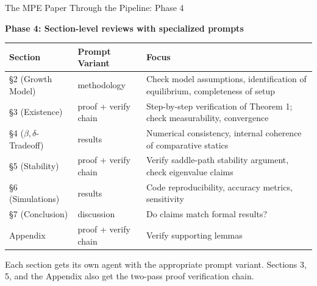 \documentclass[10pt,english,aspectratio=169]{beamer}
\begin{document}
\begin{frame}{The MPE Paper Through the Pipeline: Phase 4}

\textbf{Phase 4: Section-level reviews with specialized prompts}

\vspace{0.3cm}
\begin{small}
\begin{tabular}{lp{4cm}p{6cm}}
\toprule
\textbf{Section} & \textbf{Prompt Variant} & \textbf{Focus} \\
\midrule
\S 2 (Growth Model) & methodology & Check model assumptions, identification of equilibrium, completeness of setup \\
\S 3 (Existence) & proof + verify chain & Step-by-step verification of Theorem 1; check measurability, convergence \\
\S 4 ($\beta,\delta$-Tradeoff) & results & Numerical consistency, internal coherence of comparative statics \\
\S 5 (Stability) & proof + verify chain & Verify saddle-path stability argument, check eigenvalue claims \\
\S 6 (Simulations) & results & Code reproducibility, accuracy metrics, sensitivity \\
\S 7 (Conclusion) & discussion & Do claims match formal results? \\
Appendix & proof + verify chain & Verify supporting lemmas \\
\bottomrule
\end{tabular}
\end{small}

\vspace{0.3cm}
Each section gets its own agent with the appropriate prompt variant. Sections 3, 5, and the Appendix also get the two-pass proof verification chain.

\end{frame}
\end{document}
